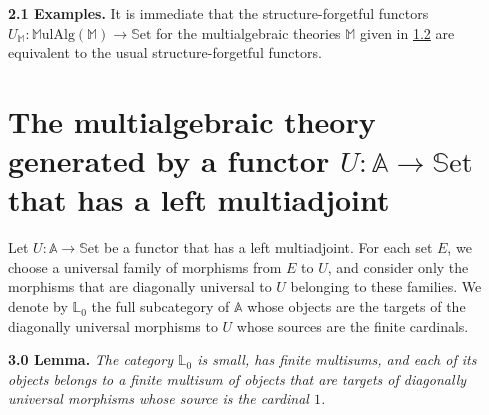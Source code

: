 \documentclass{article}
\newenvironment{itenv}[1]
  {\phantomsection\par\medskip\noindent\textbf{#1.}\itshape}
  {\medskip}
\newenvironment{rmenv}[1]
  {\phantomsection\par\medskip\noindent\textbf{#1.}\rmfamily}
  {\medskip}
\newcommand{\bb}[1]{{\mathbb{#1}}}
\newcommand{\Set}{\mathbb{S}\mathrm{et}}
\newcommand{\MulAlg}{\mathbb{M}\mathrm{ulAlg}}
\begin{document}
\begin{rmenv}{2.1 Examples}
\label{2.1}
  It is immediate that the structure-forgetful functors $U_\bb{M}\colon\MulAlg(\bb{M})\to\Set$ for the multialgebraic theories $\bb{M}$ given in \hyperref[1.2]{1.2} are equivalent to the usual structure-forgetful functors.
\end{rmenv}



\section{The multialgebraic theory generated by a functor \texorpdfstring{$U\colon\bb{A}\to\Set$}{U:A->Set} that has a left multiadjoint}
\label{3}

Let $U\colon\bb{A}\to\Set$ be a functor that has a left multiadjoint.
For each set $E$, we choose a universal family of morphisms from $E$ to $U$, and consider only the morphisms that are diagonally universal to $U$ belonging to these families.
We denote by $\bb{L}_0$ the full subcategory of $\bb{A}$ whose objects are the targets of the diagonally universal morphisms to $U$ whose sources are the finite cardinals.

\begin{itenv}{3.0 Lemma}
\label{3.0}
  The category $\bb{L}_0$ is small, has finite multisums, and each of its objects belongs to a finite multisum of objects that are targets of diagonally universal morphisms whose source is the cardinal $1$.
\end{itenv}
\end{document}
